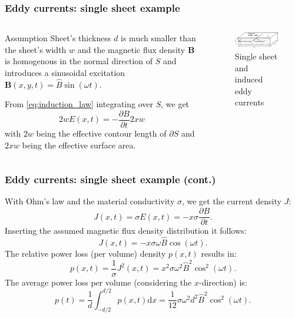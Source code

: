 \begin{frame}
	\frametitle{Eddy currents: single sheet example}
    \begin{columns}
		\begin{column}{0.5\textwidth}
            \begin{varblock}{Assumption}
                Sheet's thickness $d$ is much smaller than the sheet's width $w$ and the magnetic flux density $\bm{B}$ is homogenous in the normal direction of $S$ and introduces a sinusoidal excitation $\bm{B}(x,y,t) = \hat{B}\sin(\omega t)$.
             \end{varblock}
            From \eqref{eq:induction_law} integrating over $S$, we get
            $$
                2wE(x,t) = -\frac{\partial B}{\partial t}2xw
           $$
           with $2w$ being the effective contour length of $\partial S$ and  $2xw$ being the effective surface area.
    
        \end{column}
        \hfill
		\begin{column}{0.49\textwidth}
			\begin{figure}
				\centering
				\includegraphics[height=0.3\textheight]{fig/lec02/Eddy_currents_single_sheet.pdf}
				\caption{Single sheet and induced eddy currents}
			\end{figure}
		\end{column}
		\end{columns}
\end{frame}

\begin{frame}
	\frametitle{Eddy currents: single sheet example (cont.)}
    With Ohm's law and the material conductivity $\sigma$, we get the current density $J$:
              $$
                 J(x,t) = \sigma E(x,t) = -x\sigma\frac{\partial B}{\partial t}.
              $$ 
    Inserting the assumed magnetic flux density distribution it follows:
    $$
        J(x,t) = -x\sigma\omega\hat{B}\cos(\omega t).
    $$
    The relative power loss (per volume) density $p(x,t)$ results in:
    $$
    p(x,t) = \frac{1}{\sigma} J^2(x,t) = x^2\sigma\omega^2\hat{B}^2\cos^2(\omega t).
    $$
    The average power loss per volume (considering the $x$-direction) is:
    $$
    p(t) = \frac{1}{d} \int_{-d/2}^{d/2} p(x,t) \mathrm{d}x = \frac{1}{12}\sigma\omega^2 d^2 \hat{B}^2\cos^2(\omega t).
    $$
\end{frame}

